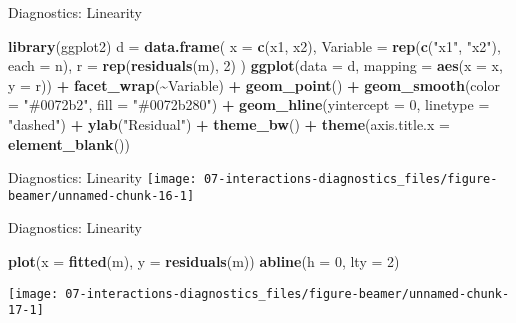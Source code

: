 \documentclass[
  ignorenonframetext,
]{beamer}
\newenvironment{Shaded}{\begin{snugshade}}{\end{snugshade}}
\newcommand{\AttributeTok}[1]{\textcolor[rgb]{0.13,0.29,0.53}{#1}}
\newcommand{\DecValTok}[1]{\textcolor[rgb]{0.00,0.00,0.81}{#1}}
\newcommand{\FunctionTok}[1]{\textcolor[rgb]{0.13,0.29,0.53}{\textbf{#1}}}
\newcommand{\NormalTok}[1]{#1}
\newcommand{\OtherTok}[1]{\textcolor[rgb]{0.56,0.35,0.01}{#1}}
\newcommand{\SpecialCharTok}[1]{\textcolor[rgb]{0.81,0.36,0.00}{\textbf{#1}}}
\newcommand{\StringTok}[1]{\textcolor[rgb]{0.31,0.60,0.02}{#1}}
\begin{document}
\begin{frame}[fragile]{Diagnostics: Linearity}
\protect\hypertarget{diagnostics-linearity}{}
\pause

\begin{Shaded}
\begin{Highlighting}[]
\FunctionTok{library}\NormalTok{(ggplot2)}
\NormalTok{d }\OtherTok{=} \FunctionTok{data.frame}\NormalTok{(}
    \AttributeTok{x =} \FunctionTok{c}\NormalTok{(x1, x2),}
    \AttributeTok{Variable =} \FunctionTok{rep}\NormalTok{(}\FunctionTok{c}\NormalTok{(}\StringTok{"x1"}\NormalTok{, }\StringTok{"x2"}\NormalTok{), }\AttributeTok{each =}\NormalTok{ n),}
    \AttributeTok{r =} \FunctionTok{rep}\NormalTok{(}\FunctionTok{residuals}\NormalTok{(m), }\DecValTok{2}\NormalTok{)}
\NormalTok{)}
\FunctionTok{ggplot}\NormalTok{(}\AttributeTok{data =}\NormalTok{ d, }\AttributeTok{mapping =} \FunctionTok{aes}\NormalTok{(}\AttributeTok{x =}\NormalTok{ x, }\AttributeTok{y =}\NormalTok{ r)) }\SpecialCharTok{+}
    \FunctionTok{facet\_wrap}\NormalTok{(}\SpecialCharTok{\textasciitilde{}}\NormalTok{Variable) }\SpecialCharTok{+}
    \FunctionTok{geom\_point}\NormalTok{() }\SpecialCharTok{+}
    \FunctionTok{geom\_smooth}\NormalTok{(}\AttributeTok{color =} \StringTok{"\#0072b2"}\NormalTok{, }\AttributeTok{fill =} \StringTok{"\#0072b280"}\NormalTok{) }\SpecialCharTok{+}
    \FunctionTok{geom\_hline}\NormalTok{(}\AttributeTok{yintercept =} \DecValTok{0}\NormalTok{, }\AttributeTok{linetype =} \StringTok{"dashed"}\NormalTok{) }\SpecialCharTok{+}
    \FunctionTok{ylab}\NormalTok{(}\StringTok{"Residual"}\NormalTok{) }\SpecialCharTok{+}
    \FunctionTok{theme\_bw}\NormalTok{() }\SpecialCharTok{+}
    \FunctionTok{theme}\NormalTok{(}\AttributeTok{axis.title.x =} \FunctionTok{element\_blank}\NormalTok{())}
\end{Highlighting}
\end{Shaded}
\end{frame}

\begin{frame}{Diagnostics: Linearity}
\protect\hypertarget{diagnostics-linearity-1}{}
\texttt{[image: 07-interactions-diagnostics\_files/figure-beamer/unnamed-chunk-16-1]}
\end{frame}

\begin{frame}[fragile]{Diagnostics: Linearity}
\protect\hypertarget{diagnostics-linearity-2}{}
\begin{Shaded}
\begin{Highlighting}[]
\FunctionTok{plot}\NormalTok{(}\AttributeTok{x =} \FunctionTok{fitted}\NormalTok{(m), }\AttributeTok{y =} \FunctionTok{residuals}\NormalTok{(m))}
\FunctionTok{abline}\NormalTok{(}\AttributeTok{h =} \DecValTok{0}\NormalTok{, }\AttributeTok{lty =} \DecValTok{2}\NormalTok{)}
\end{Highlighting}
\end{Shaded}

\texttt{[image: 07-interactions-diagnostics\_files/figure-beamer/unnamed-chunk-17-1]}
\end{frame}
\end{document}
